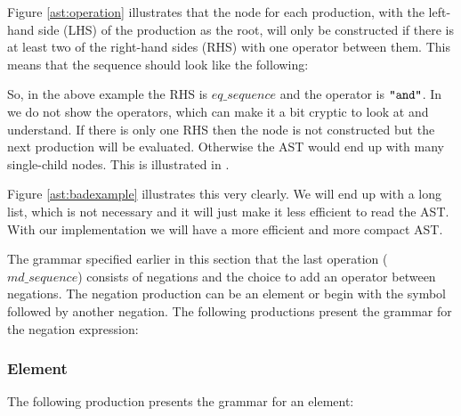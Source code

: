 

Figure \ref{ast:operation} illustrates that the node for each production, with the left-hand side (LHS) of the production as the root, will only be constructed if there is at least two of the right-hand sides (RHS) with one operator between them. This means that the sequence should look like the following:

\begin{ebnf}
\end{ebnf}

So, in the above example the RHS is $eq\_sequence$ and the operator is $\texttt{"and"}$. In  we do not show the operators, which can make it a bit cryptic to look at and understand. If there is only one RHS then the node is not constructed but the next production will be evaluated. Otherwise the AST would end up with many single-child nodes. This is illustrated in .



Figure \ref{ast:badexample} illustrates this very clearly. We will end up with a long list, which is not necessary and it will just make it less efficient to read the AST. With our implementation we will have a more efficient and more compact AST.

The grammar specified earlier in this section that the last operation ($md\_sequence$) consists of negations and the choice to add an operator between negations. The negation production can be an element or begin with the \gter{-} symbol followed by another negation.
The following productions present the grammar for the negation expression:

\begin{ebnf}
\end{ebnf}

\subsubsection{Element}

The following production presents the grammar for an element:

\begin{ebnf}%
\end{ebnf}%


